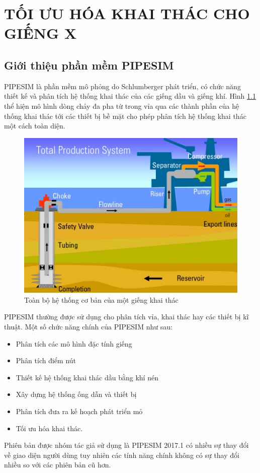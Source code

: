 \documentclass[12pt,a4paper]{report}
\begin{document}
\chapter{TỐI ƯU HÓA KHAI THÁC CHO GIẾNG X}

\section{Giới thiệu phần mềm PIPESIM}
PIPESIM là phần mềm mô phỏng do Schlumberger phát triển, có chức năng thiết kế và phân tích hệ thống khai thác của các giếng dầu và giếng khí. Hình \ref{fig:production_system} thể hiện mô hình dòng chảy đa pha từ trong vỉa qua các thành phần của hệ thống khai thác tới các thiết bị bề mặt cho phép phân tích hệ thống khai thác một cách toàn diện.
	\begin{figure}[h]
		\centering
		\includegraphics[scale=0.6]{Fig/production_system.png}
		\caption{Toàn bộ hệ thống cơ bản của một giếng khai thác}
		\label{fig:production_system}
	\end{figure}
\newline
PIPESIM thường được sử dụng cho phân tích vỉa, khai thác hay các thiết bị kĩ thuật. Một số chức năng chính của PIPESIM như sau:
	\begin{itemize}
		\item Phân tích các mô hình đặc tính giếng
		\item Phân tích điểm nút
		\item Thiết kế hệ thống khai thác dầu bằng khí nén
		\item Xây dựng hệ thống ống dẫn và thiết bị
		\item Phân tích đưa ra kế hoạch phát triển mỏ
		\item Tối ưu hóa khai thác.
	\end{itemize}
Phiên bản được nhóm tác giả sử dụng là PIPESIM 2017.1 có nhiều sự thay đổi về giao diện người dùng tuy nhiên các tính năng chính không có sự thay đổi nhiều so với các phiên bản cũ hơn.
\end{document}
